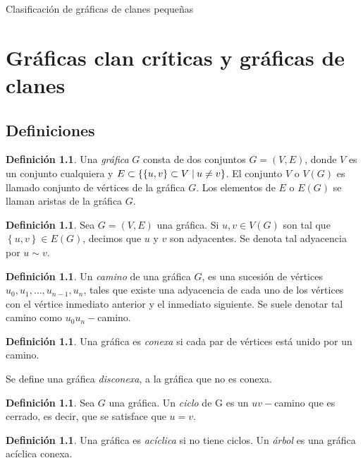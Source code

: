 \documentclass[12pt]{book}
\theoremstyle{definition}
\newtheorem{definition}[theorem]{Definición}
\newcommand{\set}[2]{\{#1\nonscript\;\vert\allowbreak\nonscript\:\mathopen{}#2\}}
\begin{document}
\begin{titlepage}

	\vfill

	{\LARGE Clasificación de gráficas de clanes pequeñas}\\[2cm]

	\vfill
\end{titlepage}
\chapter{Gráficas clan críticas y gráficas de clanes}
\section{Definiciones}

\begin{definition}
Una \emph{gráfica} $G$ consta de dos conjuntos $G=(V,E)$, donde $V$ es un conjunto cualquiera y $E\subset \set{\left\{u,v\right\}\subset V}{u\neq v}$. El conjunto $V$ o $V(G)$ es llamado conjunto de vértices de la gráfica $G$. Los elementos de $E$ o $E(G)$ se llaman aristas de la gráfica $G$.
\end{definition}

\begin{definition}
Sea $G=(V,E)$ una gráfica. Si $u,v\in V(G)$ son tal que $\left\{u,v\right\}\in E(G)$, decimos que $u$ y $v$ son adyacentes. Se denota tal adyacencia por $u\sim v$.
\end{definition}

\begin{definition}
Un \emph{camino} de una gráfica $G$, es una sucesión de vértices $u_0,u_1,\dots,u_{n-1},u_n$, tales que existe una adyacencia de cada uno de los vértices con el vértice inmediato anterior y el inmediato siguiente. Se suele denotar tal camino como $u_0u_n-$camino.
\end{definition}

\begin{definition}
Una gráfica es \emph{conexa} si cada par de vértices está unido por un camino.
\end{definition}
Se define una gráfica \emph{disconexa}, a la gráfica que no es conexa.

\begin{definition}
Sea $G$ una gráfica. Un \emph{ciclo} de G es un $uv-$camino que es cerrado, es decir, que se satisface que $u=v$.
\end{definition}

\begin{definition}
Una gráfica es \emph{acíclica} si no tiene ciclos. Un \emph{árbol} es una gráfica acíclica conexa. 
\end{definition}
\end{document}
